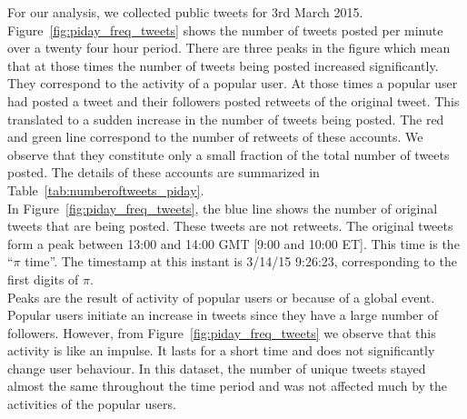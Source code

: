 \documentclass[journal, a4paper, 12pt]{article}
\begin{document}
For our analysis, we collected public tweets for 3rd March 2015. Figure~\ref{fig:piday_freq_tweets} shows the number of tweets posted per minute over a twenty four hour period. There are three peaks in the figure which mean that at those times the number of tweets being posted increased significantly.
They correspond to the activity of a popular user. At those times a popular user had posted a tweet and their followers posted retweets of the original tweet. This translated to a sudden increase in the number of tweets being posted. The red and green line correspond to the number of retweets of these accounts. We observe that they constitute only a small fraction of the total number of tweets posted. The details of these accounts are summarized in Table~\ref{tab:numberoftweets_piday}. 
\\

In Figure~\ref{fig:piday_freq_tweets}, the blue line shows the number of original tweets that are being posted. These tweets are not retweets. The original tweets form a peak between 13:00 and 14:00 GMT [9:00 and 10:00 ET]. This time is the ``$\pi$ time''. The timestamp at this instant is 3/14/15 9:26:23, corresponding to the first digits of $\pi$.
\\

Peaks are the result of activity of popular users or because of a global event. Popular users initiate an increase in tweets since they have a large number of followers. However, from Figure~\ref{fig:piday_freq_tweets} we observe that this activity is like an impulse. It lasts for a short time and does not significantly change user behaviour. In this dataset, the number of unique tweets stayed almost the same throughout the time period and was not affected much by the activities of the popular users.
\\
      
    
\end{document}
